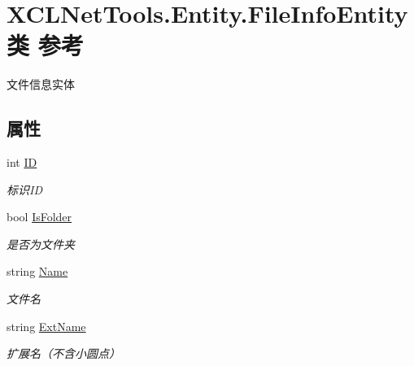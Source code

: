 \hypertarget{class_x_c_l_net_tools_1_1_entity_1_1_file_info_entity}{\section{X\-C\-L\-Net\-Tools.\-Entity.\-File\-Info\-Entity类 参考}
\label{class_x_c_l_net_tools_1_1_entity_1_1_file_info_entity}
}


文件信息实体  


\subsection*{属性}
\begin{DoxyCompactItemize}
\item 
int \hyperlink{class_x_c_l_net_tools_1_1_entity_1_1_file_info_entity_a150f26081f12badeea9a2255bbea6faf}{I\-D}
\begin{DoxyCompactList}\small\item\em 标识\-I\-D \end{DoxyCompactList}\item 
bool \hyperlink{class_x_c_l_net_tools_1_1_entity_1_1_file_info_entity_ad945716535742c01f83dffc2766c0987}{Is\-Folder}
\begin{DoxyCompactList}\small\item\em 是否为文件夹 \end{DoxyCompactList}\item 
string \hyperlink{class_x_c_l_net_tools_1_1_entity_1_1_file_info_entity_a15a2bb6c738c32250f00604b6636cae4}{Name}
\begin{DoxyCompactList}\small\item\em 文件名 \end{DoxyCompactList}\item 
string \hyperlink{class_x_c_l_net_tools_1_1_entity_1_1_file_info_entity_a46ccaf5dbcc1154782c0227c83eb54e4}{Ext\-Name}
\begin{DoxyCompactList}\small\item\em 扩展名（不含小圆点） \end{DoxyCompactList}\item 

\end{DoxyCompactItemize}
